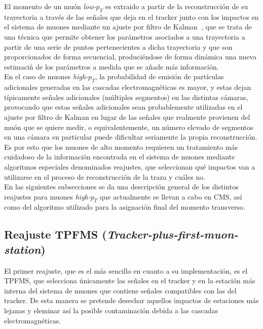
El momento de un mu\'on \textit{low-$p_{T}$} es extraido a partir de la reconstrucci\'on de su trayectoria a trav\'es de las se\~nales que deja en el tracker junto con los impactos en el sistema de muones mediante un ajuste por filtro de Kalman~\cite{Kalman1960ANA}, que se trata de una t\'ecnica que permite obtener los par\'ametros asociados a una trayectoria a partir de una serie de puntos pertenecientes a dicha trayectoria y que son proporcionados de forma secuencial, produci\'endose de forma din\'amica una nueva estimaci\'n de los par\'ametros a medida que se a\~nade más informaci\'on. \\

En el caso de muones \textit{high-$p_{T}$}, la probabilidad de emisi\'on de part\'iculas adicionales generadas en las cascadas electromagn\'eticas es mayor, y estas dejan t\'ipicamente se\~nales adicionales (m\'ultiples segmentos) en las distintas c\'amaras, provocando que estas se\~nales adicionales sean probablemente utilizadas en el ajuste por filtro de Kalman en lugar de las se\~nales que realmente provienen del mu\'on que se quiere medir, o equivalentemente, un n\'umero elevado de segmentos en una c\'amara en particular puede dificultar seriamente la propia reconstrucci\'on. Es por esto que los muones de alto momento requieren un tratamiento m\'as cuidadoso de la informaci\'on encontrada en el sistema de muones mediante algoritmos especiales denominados reajustes, que seleccionan qu\'e impactos van a utilizarse en el proceso de reconstrucci\'on de la traza y cu\'ales no. \\

En las siguientes subsecciones se da una descripci\'on general de los distintos reajustes para muones \textit{high-$p_{T}$} que actualmente se llevan a cabo en CMS, as\'i como del algoritmo utilizado para la asignaci\'on final del momento transverso.

\subsection{Reajuste TPFMS (\textit{Tracker-plus-first-muon-station})}\label{sec:TPFMS}

El primer reajuste, que es el m\'as sencillo en cuanto a su implementaci\'on, es el TPFMS, que selecciona \'unicamente las se\~nales en el tracker y en la estaci\'on m\'as interna del sistema de muones que contiene se\~nales compatibles con las del tracker. De esta manera se pretende desechar aquellos impactos de estaciones m\'as lejanas y eleminar as\'i la posible contaminaci\'on debida a las cascadas electromagn\'eticas.

